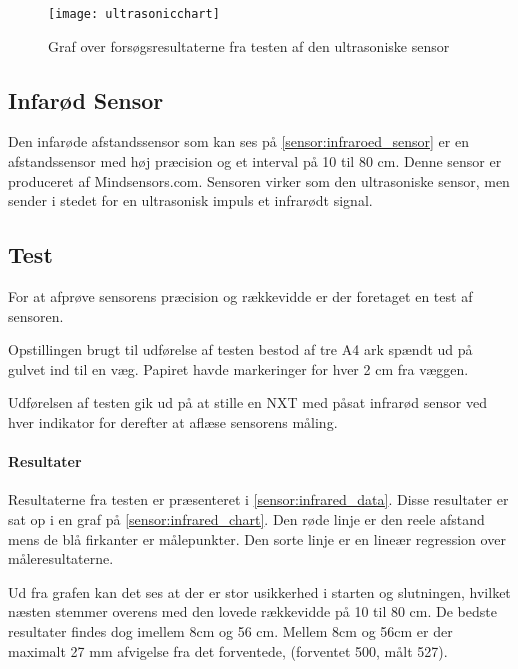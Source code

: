 \begin{figure}[h]
\centering
\texttt{[image: ultrasonicchart]}
\caption{Graf over forsøgsresultaterne fra testen af den ultrasoniske sensor}
\label{sensor:ultrasonic_resultat_diagram}
\end{figure}



\subsection{Infarød Sensor}
Den infarøde afstandssensor som kan ses på \cref{sensor:infraroed_sensor} er en afstandssensor med høj præcision og et interval på 10 til 80 cm. 
Denne sensor er produceret af Mindsensors.com. 
Sensoren virker som den ultrasoniske sensor, men sender i stedet for en ultrasonisk impuls et infrarødt signal. 

\subsection{Test}
For at afprøve sensorens præcision og rækkevidde er der foretaget en test af sensoren.

Opstillingen brugt til udførelse af testen bestod af tre A4 ark spændt ud på gulvet ind til en væg. 
Papiret havde markeringer for hver 2 cm fra væggen.

Udførelsen af testen gik ud på at stille en NXT med påsat infrarød sensor ved hver indikator for derefter at aflæse sensorens måling.

\paragraph{Resultater}

Resultaterne fra testen er præsenteret i \cref{sensor:infrared_data}. 
Disse resultater er sat op i en graf på \cref{sensor:infrared_chart}.
Den røde linje er den reele afstand mens de blå firkanter er målepunkter.
Den sorte linje er en lineær regression over måleresultaterne.

Ud fra grafen kan det ses at der er stor usikkerhed i starten og slutningen, hvilket næsten stemmer overens med den lovede rækkevidde på 10 til 80 cm.
De bedste resultater findes dog imellem 8cm og 56 cm. 
Mellem 8cm og 56cm er der maximalt 27 mm afvigelse fra det forventede, (forventet 500, målt 527).
\paragraph{}

